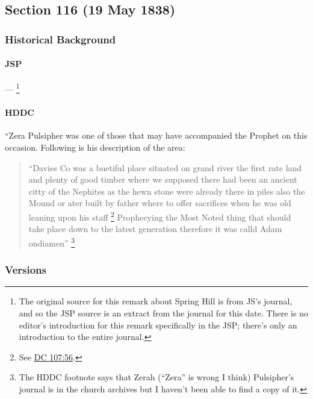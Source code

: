 \subsection{Section 116 (19 May 1838)}
	\label{DC116}
	
	\subsubsection{Historical Background}
		\label{DC116-HB}
		
		\paragraph{JSP}
		
			---%
				\footnote{%
					The original source for this remark about Spring Hill is from JS's journal, and so the JSP source is an extract from the journal for this date. There is no editor's introduction for this remark specifically in the JSP; there's only an introduction to the entire journal.
					}
					
		\paragraph{HDDC}
		
			``Zera Pulsipher was one of those that may have accompanied the Prophet on this occasion. Following is his description of the area:
			
			\begin{quote}
				``Davies Co was a buetiful place situated on grand river the first rate land and plenty of good timber where we supposed there had been an ancient citty of the Nephites as the hewn stone were already there in piles also the Mound or ater built by father where to offer sacrifices when he was old leaning upon his staff%
					\footnote{%
						See \hyperref[DC107-56]{DC 107:56}.
						}
				Prophecying the Most Noted thing that should take place down to the latest generation therefore it was calld Adam ondiamen''%
					\footnote{%
						The HDDC footnote says that Zerah (``Zera'' is wrong I think) Pulsipher's journal is in the church archives but I haven't been able to find a copy of it.
						}
			\end{quote}
					
	\subsubsection{Versions}
		\label{DC116-V}
		
